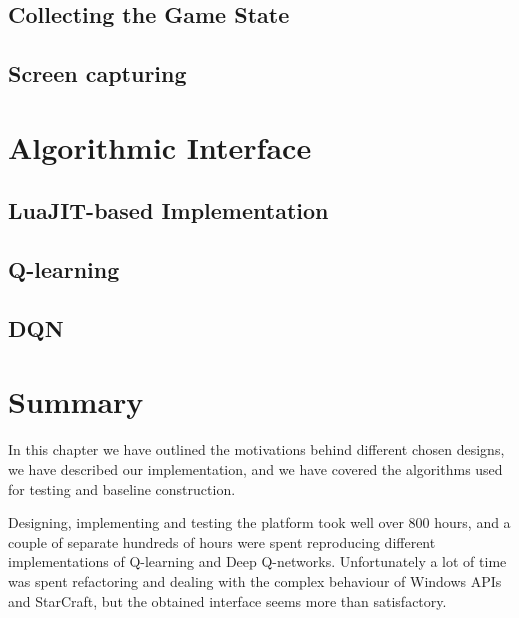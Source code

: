 \subsection{Collecting the Game State}

\subsection{Screen capturing}

\section{Algorithmic Interface}

\subsection{LuaJIT-based Implementation}

\subsection{Q-learning}

\subsection{DQN}

\section{Summary}

In this chapter we have outlined the motivations behind different chosen
designs, we have described our implementation, and we have covered the algorithms
used for testing and baseline construction.

Designing, implementing and testing the platform took well over 800 hours, and a
couple of separate hundreds of hours were spent reproducing different
implementations of Q-learning and Deep Q-networks. Unfortunately a lot of time
was spent refactoring and dealing with the complex behaviour of Windows APIs and
StarCraft, but the obtained interface seems more than satisfactory.

